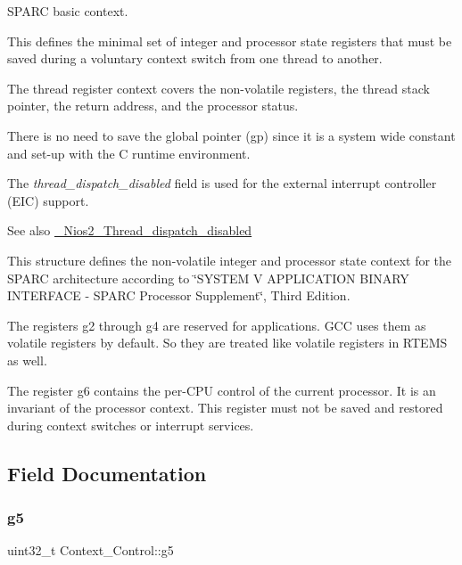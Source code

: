 S\+P\+A\+RC basic context.

This defines the minimal set of integer and processor state registers that must be saved during a voluntary context switch from one thread to another.

The thread register context covers the non-\/volatile registers, the thread stack pointer, the return address, and the processor status.

There is no need to save the global pointer (gp) since it is a system wide constant and set-\/up with the C runtime environment.

The {\itshape thread\+\_\+dispatch\+\_\+disabled} field is used for the external interrupt controller (E\+IC) support.

\begin{DoxySeeAlso}{See also}
\mbox{\hyperlink{nios2-thread-dispatch-disabled_8c_af065794b1f232ce93bb2caee956c4e69}{\+\_\+\+Nios2\+\_\+\+Thread\+\_\+dispatch\+\_\+disabled}}
\end{DoxySeeAlso}
This structure defines the non-\/volatile integer and processor state context for the S\+P\+A\+RC architecture according to \char`\"{}\+S\+Y\+S\+T\+E\+M V A\+P\+P\+L\+I\+C\+A\+T\+I\+O\+N B\+I\+N\+A\+R\+Y
\+I\+N\+T\+E\+R\+F\+A\+C\+E -\/ S\+P\+A\+R\+C Processor Supplement\char`\"{}, Third Edition.

The registers g2 through g4 are reserved for applications. G\+CC uses them as volatile registers by default. So they are treated like volatile registers in R\+T\+E\+MS as well.

The register g6 contains the per-\/\+C\+PU control of the current processor. It is an invariant of the processor context. This register must not be saved and restored during context switches or interrupt services. 

\subsection{Field Documentation}
\mbox{\label{structContext__Control_a24aefcdc01bea35a9e682636ae1272f1}} 
\subsubsection{\texorpdfstring{g5}{g5}}
{\footnotesize\ttfamily uint32\+\_\+t Context\+\_\+\+Control\+::g5}

